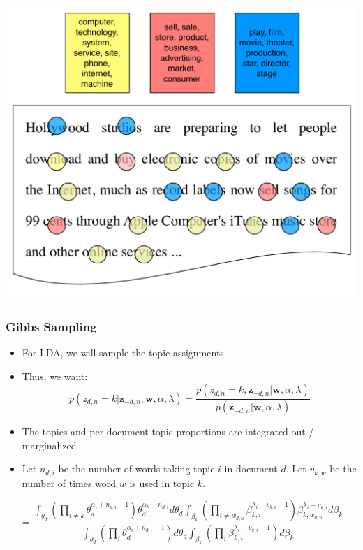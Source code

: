 {\begin{center}
 {\includegraphics[width=.8\linewidth]{topic_models/inference_3}}
	\end{center}
}


\ifconjugacy

\begin{frame}
\frametitle{Gibbs Sampling}
\begin{itemize}
\item For LDA, we will sample the topic assignments
\item Thus, we want:
\begin{equation*}
p(z_{d,n} = k | {\bm z}_{-d,n}, {\bm w}, \alpha, \lambda) = \frac{ p(z_{d,n} = k, {\bm z}_{-d,n} | {\bm w}, \alpha, \lambda)} { p({\bm z}_{-d,n} | {\bm w},\alpha, \lambda)}
\end{equation*}
\pause
\item The topics and per-document topic proportions are integrated out / marginalized
\item Let $n_{d,i}$ be the number of words taking topic $i$ in document $d$.  Let $v_{k,w}$ be the number of times word $w$ is used in topic $k$.
\end{itemize}


\begin{equation*}
= \frac{ \int_{\theta_d} \left( \prod_{i \not = k} \theta_d^{\alpha_i + n_{d,i} - 1} \right)\theta_d^{\alpha_k + n_{d,i} } d\theta_d \int_{\beta_{k}}    \left( \prod_{i \not = w_{d,n}} \beta_{k,i} ^{ \lambda_i + v_{k,i} - 1} \right) \beta_{k, w_{d,n}}^{\lambda_i + v_{k,i}} d\beta_k } { \int_{\theta_d} \left( \prod_{i} \theta_d^{\alpha_i + n_{d,i} - 1} \right) d\theta_d \int_{\beta_{k}}    \left( \prod_{i} \beta_{k,i} ^{ \lambda_i + v_{k,i} - 1} \right) d\beta_k }
\end{equation*}
\end{frame}

